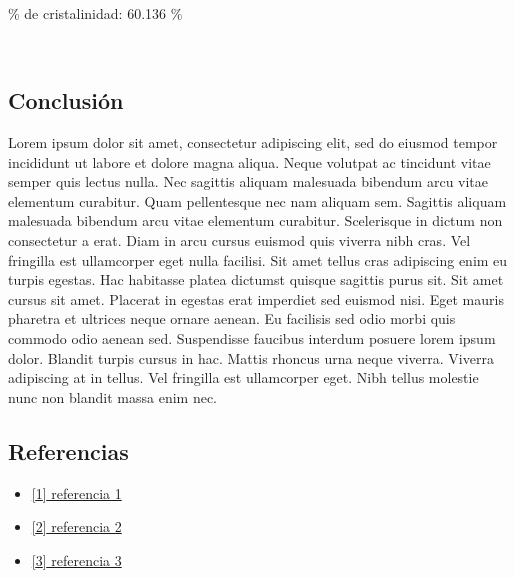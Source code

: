 \documentclass[11pt]{article}
\makeatletter
\providecommand{\tightlist}{%
      \setlength{\itemsep}{0pt}\setlength{\parskip}{0pt}}
\newcommand{\boxspacing}{\kern\kvtcb@left@rule\kern\kvtcb@boxsep}
\newcommand{\prompt}[4]{
        {\ttfamily\llap{{\color{#2}[#3]:\hspace{3pt}#4}}\vspace{-\baselineskip}}
    }
\makeatother
\begin{document}
    ~

\% de cristalinidad: 60.136 \%

~

    
    \subsection{Conclusión}\label{conclusiuxf3n}

Lorem ipsum dolor sit amet, consectetur adipiscing elit, sed do eiusmod
tempor incididunt ut labore et dolore magna aliqua. Neque volutpat ac
tincidunt vitae semper quis lectus nulla. Nec sagittis aliquam malesuada
bibendum arcu vitae elementum curabitur. Quam pellentesque nec nam
aliquam sem. Sagittis aliquam malesuada bibendum arcu vitae elementum
curabitur. Scelerisque in dictum non consectetur a erat. Diam in arcu
cursus euismod quis viverra nibh cras. Vel fringilla est ullamcorper
eget nulla facilisi. Sit amet tellus cras adipiscing enim eu turpis
egestas. Hac habitasse platea dictumst quisque sagittis purus sit. Sit
amet cursus sit amet. Placerat in egestas erat imperdiet sed euismod
nisi. Eget mauris pharetra et ultrices neque ornare aenean. Eu facilisis
sed odio morbi quis commodo odio aenean sed. Suspendisse faucibus
interdum posuere lorem ipsum dolor. Blandit turpis cursus in hac. Mattis
rhoncus urna neque viverra. Viverra adipiscing at in tellus. Vel
fringilla est ullamcorper eget. Nibh tellus molestie nunc non blandit
massa enim nec.

\subsection{Referencias}\label{referencias}

\begin{itemize}
\tightlist
\item
  \href{'https://www.youtube.com/watch?v=dQw4w9WgXcQ'}{{[}1{]}
  referencia 1}
\item
  \href{'https://www.youtube.com/watch?v=dQw4w9WgXcQ'}{{[}2{]}
  referencia 2}
\item
  \href{'https://www.youtube.com/watch?v=dQw4w9WgXcQ'}{{[}3{]}
  referencia 3}
\end{itemize}

    \begin{tcolorbox}[breakable, size=fbox, boxrule=1pt, pad at break*=1mm,colback=cellbackground, colframe=cellborder]
\prompt{In}{incolor}{ }{\boxspacing}
\begin{Verbatim}[commandchars=\\\{\}]

\end{Verbatim}
\end{tcolorbox}


    
    
    
\end{document}
